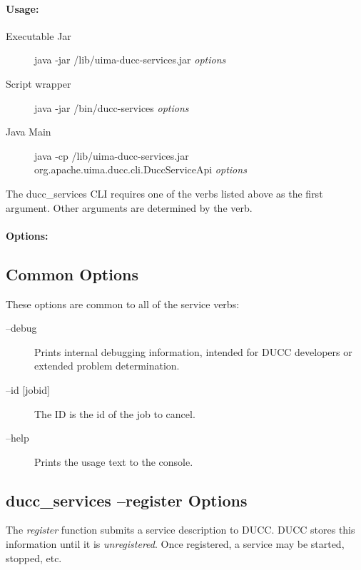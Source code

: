     \paragraph{Usage:}
       \begin{description}
          \item[Executable Jar] java -jar \ducchome/lib/uima-ducc-services.jar {\em options}
          \item[Script wrapper] java -jar \ducchome/bin/ducc-services {\em options}
          \item[Java Main]      java -cp \ducchome/lib/uima-ducc-services.jar org.apache.uima.ducc.cli.DuccServiceApi {\em options}
          \end{description}
          
          The ducc\_services CLI requires one of the verbs listed above as the first argument. Other arguments are determined
          by the verb.

    \paragraph{Options:}

    \subsection{Common Options}
        These options are common to all of the service verbs:
        \begin{description}
           \item[--debug ]          
             Prints internal debugging information, intended for DUCC developers or extended problem determination.                    
           \item[--id {[jobid]}]
             The ID is the id of the job to cancel.
           \item[--help]
             Prints the usage text to the console. 
        \end{description}
        
    \subsection{ducc\_services --register Options}

       The {\em register} function submits a service description to DUCC.  DUCC stores this 
       information until it is {\em unregistered}.  Once registered, a service may be
       started, stopped, etc.

